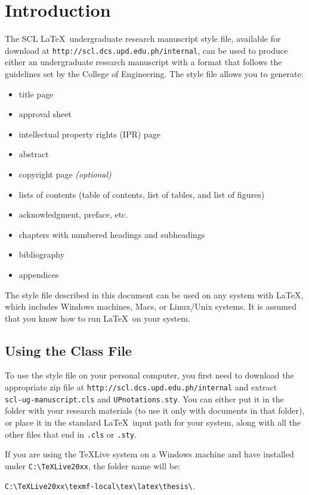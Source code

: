 \chapter{Introduction}
\label{cha:intro}

The SCL \LaTeX\ undergraduate research manuscript style file, available for download at {\tt http://scl.dcs.upd.edu.ph/internal}, can be used
to produce either an undergraduate research manuscript with a format that follows the guidelines set by the College of Engineering.
The style file allows you to generate:
\begin{itemize}
\item title page
\item approval sheet
\item intellectual property rights (IPR) page
\item abstract
\item copyright page \textit{(optional)}
\item lists of contents (table of contents, list of tables, and list of figures)
\item acknowledgment, preface, etc.
\item chapters with numbered headings and subheadings
\item bibliography
\item appendices
\end{itemize}

The style file described in this document can be used on any system
with \LaTeX, which includes Windows machines, Macs, or Linux/Unix systems. It is assumed that you know how to run \LaTeX\  on your system.


\section{Using the Class File}
To use the style file on your personal computer, you first need to download the appropriate zip file at {\tt http://scl.dcs.upd.edu.ph/internal} and extract\\ \texttt{scl-ug-manuscript.cls} and {\tt UPnotations.sty}. You can either put it in the folder with your research materials
(to use it only with documents in that folder), or place it in the standard \LaTeX\ input path
for your system, along with all the other files that end in \texttt{.cls} or \texttt{.sty}.

If you are using the TeXLive system on a Windows machine and
have installed under {\tt C:\textbackslash TeXLive20xx}, the folder name will be:

\begin{center}
{\tt C:\textbackslash TeXLive20xx\textbackslash texmf-local\textbackslash tex\textbackslash latex\textbackslash thesis\textbackslash}.
\end{center}
